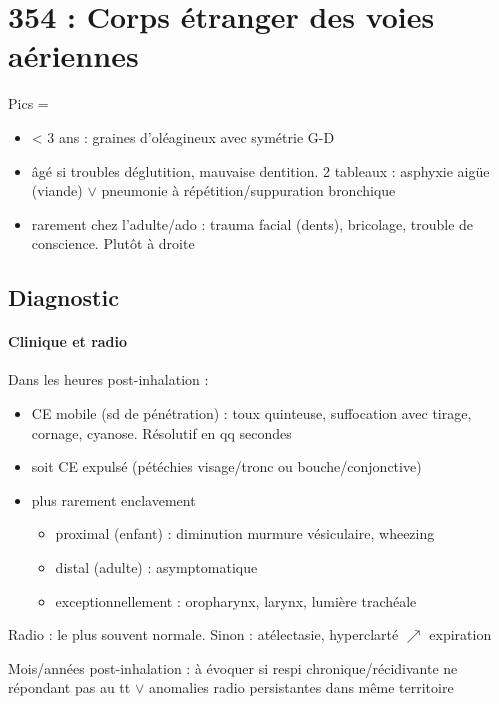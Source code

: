 \documentclass{article}
\begin{document}
\section{354 : Corps étranger des voies aériennes}%
\label{sec:354_corps_etranger_des_voies_aeriennes}

Pics = 
\begin{itemize}
\item < 3 ans : graines d'oléagineux avec symétrie G-D
\item âgé si troubles déglutition, mauvaise dentition. 2 tableaux : asphyxie
  aigüe (viande) $\vee$ pneumonie à répétition/suppuration bronchique
\item rarement chez l'adulte/ado : trauma facial (dents), bricolage, trouble
  de conscience. Plutôt à droite
\end{itemize}

\subsection{Diagnostic}
\paragraph{Clinique et radio}
Dans les heures post-inhalation :
\begin{itemize}
\item CE mobile (sd de pénétration) : toux quinteuse, suffocation avec tirage,
  cornage, cyanose. Résolutif en qq secondes
\item soit CE expulsé (pétéchies visage/tronc ou bouche/conjonctive)
\item plus rarement enclavement 
  \begin{itemize}
  \item proximal (enfant) : diminution murmure vésiculaire, wheezing
  \item distal (adulte) : asymptomatique
  \item exceptionnellement : oropharynx, larynx, lumière trachéale
  \end{itemize}
\end{itemize}
Radio : le plus souvent normale. Sinon : atélectasie, hyperclarté $\nearrow$
expiration

Mois/années post-inhalation : à évoquer si respi chronique/récidivante ne
répondant pas au tt $\vee$ anomalies radio persistantes dans même territoire
\end{document}
